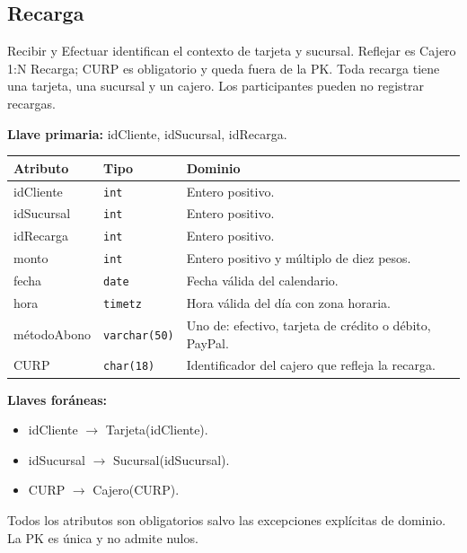 \par\noindent\begin{minipage}{\textwidth}
\subsection{Recarga}
Recibir y Efectuar identifican el contexto de tarjeta y sucursal. Reflejar es Cajero 1:N Recarga; CURP es obligatorio y queda fuera de la PK. Toda recarga tiene una tarjeta, una sucursal y un cajero. Los participantes pueden no registrar recargas.\par
\textbf{Llave primaria:} idCliente, idSucursal, idRecarga.\par
{\small\begin{tabular}{@{}p{}p{}p{}@{}}
\toprule Atributo & Tipo & Dominio \\ \midrule
idCliente & \texttt{int} & Entero positivo. \\
idSucursal & \texttt{int} & Entero positivo. \\
idRecarga & \texttt{int} & Entero positivo. \\
monto & \texttt{int} & Entero positivo y múltiplo de diez pesos. \\
fecha & \texttt{date} & Fecha válida del calendario. \\
hora & \texttt{timetz} & Hora válida del día con zona horaria. \\
métodoAbono & \texttt{varchar(50)} & Uno de: efectivo, tarjeta de crédito o débito, PayPal. \\
CURP & \texttt{char(18)} & Identificador del cajero que refleja la recarga. \\
\bottomrule\end{tabular}}
\textbf{Llaves foráneas:}\begin{itemize}[nosep]
\item idCliente $\rightarrow$ Tarjeta(idCliente).
\item idSucursal $\rightarrow$ Sucursal(idSucursal).
\item CURP $\rightarrow$ Cajero(CURP).
\end{itemize}
Todos los atributos son obligatorios salvo las excepciones explícitas de dominio. La PK es única y no admite nulos.
\end{minipage}\par\vspace{.35cm}